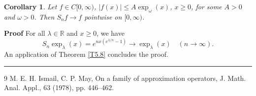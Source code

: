 \documentclass[preprint]{elsarticle}
\newtheorem{corollary}[theorem]{Corollary}
\numberwithin{equation}{section}
\newenvironment{proof}[1][Proof]{\noindent \textbf{#1} }{\  \rule{0.5em}{0.5em}}
\begin{document}
\begin{corollary}\label{cor5.9} Let \( f \in C[0,\infty) \), \( |f(x)| \le A \exp_{\omega}( x) \), \( x \ge 0 \), for some \( A>0 \) and \( \omega>0 \). Then \( S_n f \to f \) pointwise on \([0,\infty)\).\end{corollary}

\begin{proof} For all $\lambda\in  {\mathbb R}$ and $x\geq 0$, we have
	\[S_n \exp_{\lambda}(x) = e^{n x (e^{\lambda/n}-1)} \to \exp_{\lambda}(x)\quad (n \to \infty).\]
	An application of Theorem \ref{T5.8} concludes the proof. \end{proof}
\begin{thebibliography}{9}
 M. E. H. Ismail, C. P. May, On a family of approximation operators, J.  Math. Anal. Appl.,  63 (1978), pp. 446–462.
\end{thebibliography}
\end{document}
